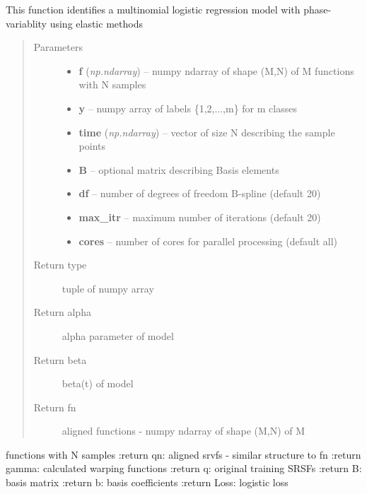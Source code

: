\documentclass[letterpaper,10pt,english]{sphinxmanual}
\begin{document}
\begin{fulllineitems}
\label{regression:regression.elastic_mlogistic}
This function identifies a multinomial logistic regression model with
phase-variablity using elastic methods
\begin{quote}\begin{description}
\item[{Parameters}] \leavevmode\begin{itemize}
\item {} 
\textbf{f} (\emph{np.ndarray}) -- numpy ndarray of shape (M,N) of M functions with N samples

\item {} 
\textbf{y} -- numpy array of labels \{1,2,...,m\} for m classes

\item {} 
\textbf{time} (\emph{np.ndarray}) -- vector of size N describing the sample points

\item {} 
\textbf{B} -- optional matrix describing Basis elements

\item {} 
\textbf{df} -- number of degrees of freedom B-spline (default 20)

\item {} 
\textbf{max\_itr} -- maximum number of iterations (default 20)

\item {} 
\textbf{cores} -- number of cores for parallel processing (default all)

\end{itemize}

\item[{Return type}] \leavevmode
tuple of numpy array

\item[{Return alpha}] \leavevmode
alpha parameter of model

\item[{Return beta}] \leavevmode
beta(t) of model

\item[{Return fn}] \leavevmode
aligned functions - numpy ndarray of shape (M,N) of M

\end{description}\end{quote}

functions with N samples
:return qn: aligned srvfs - similar structure to fn
:return gamma: calculated warping functions
:return q: original training SRSFs
:return B: basis matrix
:return b: basis coefficients
:return Loss: logistic loss

\end{fulllineitems}
\end{document}
